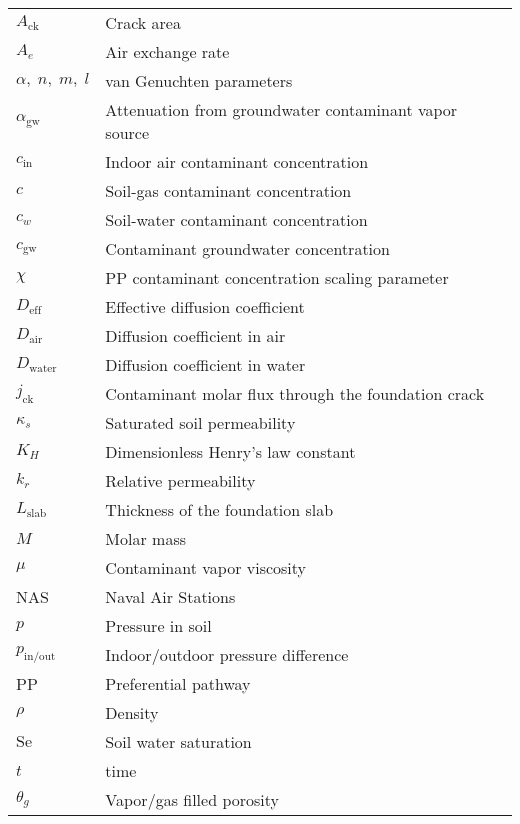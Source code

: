 \begin{table}[htb!]
  \centering
  \begin{tabular}{l l}
    \toprule
    $A_\mathrm{ck}$ & Crack area \\
    $A_e$ & Air exchange rate \\
    $\alpha, \; n, \; m, \; l$ & van Genuchten parameters \\
    $\alpha_\mathrm{gw}$ & Attenuation from groundwater contaminant vapor source \\
    $c_\mathrm{in}$ & Indoor air contaminant concentration \\
    $c$ & Soil-gas contaminant concentration \\
    $c_w$ & Soil-water contaminant concentration \\
    $c_\mathrm{gw}$ & Contaminant groundwater concentration \\
    $\chi$ & PP contaminant concentration scaling parameter \\
    $D_\mathrm{eff}$ & Effective diffusion coefficient \\
    $D_\mathrm{air}$ & Diffusion coefficient in air \\
    $D_\mathrm{water}$ & Diffusion coefficient in water \\
    $j_\mathrm{ck}$ & Contaminant molar flux through the foundation crack \\
    $\kappa_s$ & Saturated soil permeability \\
    $K_H$ & Dimensionless Henry's law constant \\
    $k_r$ & Relative permeability \\
    $L_\mathrm{slab}$ & Thickness of the foundation slab \\
    $M$ & Molar mass \\
    $\mu$ & Contaminant vapor viscosity \\
    NAS & Naval Air Stations \\
    $p$ & Pressure in soil \\
    $p_\mathrm{in/out}$ & Indoor/outdoor pressure difference \\
    PP & Preferential pathway \\
    $\rho$ & Density \\
    $\mathrm{Se}$ & Soil water saturation \\
    $t$ & time \\
    $\theta_g$ & Vapor/gas filled porosity \\

\end{tabular}
\end{table}
